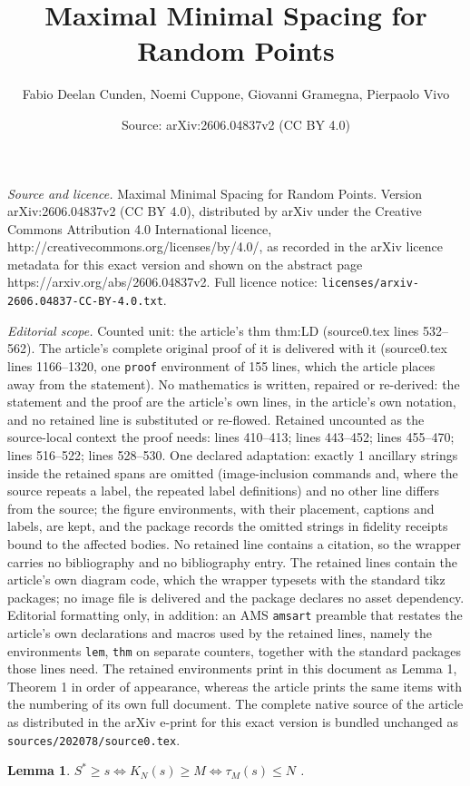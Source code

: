 \documentclass[10pt,a4paper]{amsart}
\title{Maximal Minimal Spacing for Random Points}
\author{Fabio Deelan Cunden, Noemi Cuppone, Giovanni Gramegna, Pierpaolo Vivo}
\date{Source: arXiv:2606.04837v2 (CC BY 4.0)}
\newtheorem{lem}{Lemma}
\begin{document}
\maketitle

\noindent\emph{Source and licence.} Maximal Minimal Spacing for Random Points. Version arXiv:2606.04837v2 (CC BY 4.0), distributed by arXiv under the Creative Commons Attribution 4.0 International licence, http://creativecommons.org/licenses/by/4.0/, as recorded in the arXiv licence metadata for this exact version and shown on the abstract page https://arxiv.org/abs/2606.04837v2. Full licence notice: \texttt{licenses/arxiv-2606.04837-CC-BY-4.0.txt}.\par\smallskip

\noindent\textit{Editorial scope.} Counted unit: the article's thm thm:LD (source0.tex lines 532--562). The article's complete original proof of it is delivered with it (source0.tex lines 1166--1320, one \texttt{proof} environment of 155 lines, which the article places away from the statement). No mathematics is written, repaired or re-derived: the statement and the proof are the article's own lines, in the article's own notation, and no retained line is substituted or re-flowed.  Retained uncounted as the source-local context the proof needs: lines 410--413; lines 443--452; lines 455--470; lines 516--522; lines 528--530.  One declared adaptation: exactly 1 ancillary strings inside the retained spans are omitted (image-inclusion commands and, where the source repeats a label, the repeated label definitions) and no other line differs from the source; the figure environments, with their placement, captions and labels, are kept, and the package records the omitted strings in fidelity receipts bound to the affected bodies.  No retained line contains a citation, so the wrapper carries no bibliography and no bibliography entry.  The retained lines contain the article's own diagram code, which the wrapper typesets with the standard tikz packages; no image file is delivered and the package declares no asset dependency.  Editorial formatting only, in addition: an AMS \texttt{amsart} preamble that restates the article's own declarations and macros used by the retained lines, namely the environments \texttt{lem}, \texttt{thm} on separate counters, together with the standard packages those lines need.  The retained environments print in this document as Lemma 1, Theorem 1 in order of appearance, whereas the article prints the same items with the numbering of its own full document.  The complete native source of the article as distributed in the arXiv e-print for this exact version is bundled unchanged as \texttt{sources/202078/source0.tex}.
\begin{lem}
\label{lem:equiv}
   $ S^*\geq s \iff K_N(s)\geq M \iff \tau_M(s)\leq N$ .
\end{lem}
\end{document}
